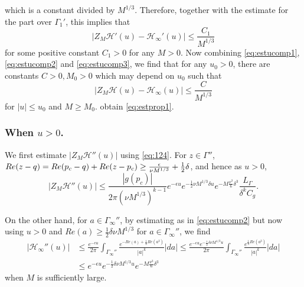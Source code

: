 \documentclass[11pt]{article}
\begin{document}
which is a constant divided by $M^{1/3}$.
Therefore, together with the estimate for the part over $\Gamma_1'$,
this implies that
\begin{equation}\label{eq:estucomp3}
   | Z_M \mathcal{H}'(u) - \mathcal{H}_\infty'(u) |
  \le \frac{C_1}{M^{1/3}}
\end{equation}
for some positive constant $C_1>0$ for any $M>0$. Now combining
\eqref{eq:estucomp1}, \eqref{eq:estucomp2} and
\eqref{eq:estucomp3}, we find that for any $u_0>0$, there are
constants $C>0, M_0>0$ which may depend on $u_0$ such that
\begin{equation}\label{eq:Hdiffcompact}
   | Z_M \mathcal{H}(u) - \mathcal{H}_\infty(u) |
  \le \frac{C}{M^{1/3}}
\end{equation}
for $|u|\le u_0$ and $M\ge M_0$.
obtain \eqref{eq:estprop1}.


\subsubsection{When $u>0$.}

We first estimate $|Z_M \mathcal{H}''(u)|$ using \eqref{eq:124}.
For $z\in \Gamma''$, $Re(z-q) = Re(p_c-q)+Re(z-p_c) \ge
\frac{\epsilon}{\nu M^{1/3}} + \frac12\delta$, and hence as $u>0$,
\begin{equation}\label{eq:140}
  |Z_M \mathcal{H}''(u)| \le \frac{|g(p_c)|}{2\pi (\nu M^{1/3})^{k-1}}
    e^{-\epsilon u} e^{-\frac12 \nu M^{1/3}\delta u}
    e^{-M\frac{\nu^3}6 \delta^3} \frac{L_{\Gamma}}{\delta^k C_g}.
\end{equation}

On the other hand, for $a\in \Gamma_\infty''$, by estimating as in
\eqref{eq:estucomp2} but now using $u>0$ and $Re(a)\ge
\frac12\delta \nu M^{1/3}$ for $a\in\Gamma_\infty''$, we find
\begin{equation}\label{eq:141}
\begin{split}
  |\mathcal{H}_\infty''(u)|
  &\le \frac{e^{-\epsilon u}}{2\pi} \int_{\Gamma_\infty''}
  \frac{e^{- Re(a)+\frac13 Re(a^3)}}{|a|^k} |da|
  \le \frac{e^{-\epsilon u}e^{-\frac12 \delta \nu M^{1/3} u}}{2\pi} \int_{\Gamma_\infty''}
  \frac{e^{\frac13 Re(a^3)}}{|a|^k} |da| \\
  & \le e^{-\epsilon u} e^{-\frac12 \delta \nu M^{1/3} u}
  e^{-M \frac{\nu^3}{6} \delta^3}
\end{split}
\end{equation}
when $M$ is sufficiently large.
\end{document}
